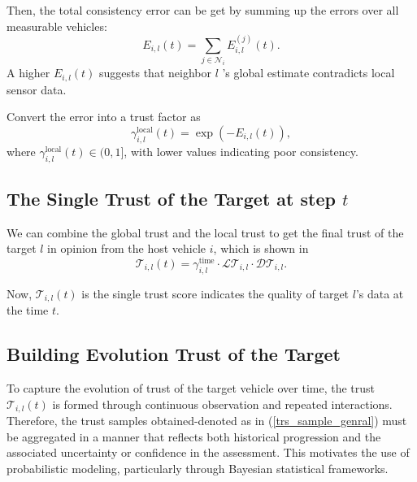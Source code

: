 \documentclass[letterpaper, 10pt, conference]{ieeeconf}  %
\def\eqref#1{(\ref{#1})}
\def\N{\mathcal{N}} %
\def\LT{\mathcal{LT}} %
\def\DT{\mathcal{DT}} %
\def\T{\mathcal{T}} %
\begin{document}
Then, the total consistency error can be get by summing up the errors over all measurable vehicles:
\begin{equation} 
    E_{i,l}(t) = \sum_{j \in \N_i} E_{i,l}^{(j)}(t).
\end{equation}
A higher $E_{i,l}(t)$  suggests that neighbor  $l$ 's global estimate contradicts local sensor data.

Convert the error into a trust factor as
\begin{equation}
    \gamma_{i,l}^{\text{local}}(t) = \exp\left( -{E_{i,l}(t)} \right),
\end{equation}
where $\gamma_{i,l}^{\text{local}}(t) \in (0, 1]$, with lower values indicating poor consistency. 


\subsection{The Single Trust of the Target at step $t$}  
We can combine the global trust and the local trust to get the final trust of the target $l$ in opinion from the host vehicle $i$, which is shown in 
\begin{equation}
    \T_{i,l}(t) = \gamma_{i,l}^{\text{time}} \cdot  \LT_{i,l} \cdot \DT_{i,l}. 
    \label{trs_sample_genral}
\end{equation}

Now, $\T_{i,l}(t)$ is the single trust score indicates the quality of target $l$'s data at the time $t$.


\subsection{Building Evolution Trust of the Target} \label{sec_Evolution_trust}
To capture the evolution of trust of the target vehicle over time, the trust $\T_{i,l}(t)$ is formed through continuous observation and repeated interactions. 
Therefore, the trust samples obtained-denoted as in \eqref{trs_sample_genral} must be aggregated in a manner that reflects both historical progression and the associated uncertainty or confidence in the assessment. 
This motivates the use of probabilistic modeling, particularly through Bayesian statistical frameworks. 
\end{document}
